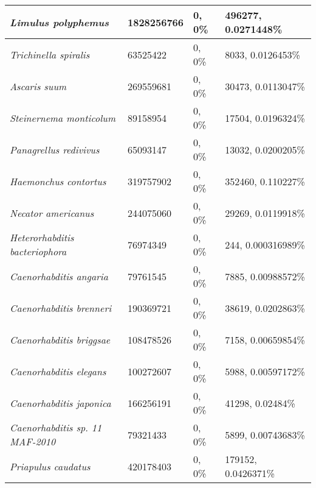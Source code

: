 {\begin{longtable}{| L{4cm} | L{2.7cm}  | L{3.7cm} | L{3.7cm} |}
\textit{Limulus polyphemus} & 1828256766 & 0, 0\% & 496277, 0.0271448\% \\ \hline
\textit{Trichinella spiralis} & 63525422 & 0, 0\% & 8033, 0.0126453\% \\ \hline
\textit{Ascaris suum} & 269559681 & 0, 0\% & 30473, 0.0113047\% \\ \hline
\textit{Steinernema monticolum} & 89158954 & 0, 0\% & 17504, 0.0196324\% \\ \hline
\textit{Panagrellus redivivus} & 65093147 & 0, 0\% & 13032, 0.0200205\% \\ \hline
\textit{Haemonchus contortus} & 319757902 & 0, 0\% & 352460, 0.110227\% \\ \hline
\textit{Necator americanus} & 244075060 & 0, 0\% & 29269, 0.0119918\% \\ \hline
\textit{Heterorhabditis bacteriophora} & 76974349 & 0, 0\% & 244, 0.000316989\% \\ \hline
\textit{Caenorhabditis angaria} & 79761545 & 0, 0\% & 7885, 0.00988572\% \\ \hline
\textit{Caenorhabditis brenneri} & 190369721 & 0, 0\% & 38619, 0.0202863\% \\ \hline
\textit{Caenorhabditis briggsae} & 108478526 & 0, 0\% & 7158, 0.00659854\% \\ \hline
\textit{Caenorhabditis elegans} & 100272607 & 0, 0\% & 5988, 0.00597172\% \\ \hline
\textit{Caenorhabditis japonica} & 166256191 & 0, 0\% & 41298, 0.02484\% \\ \hline
\textit{Caenorhabditis sp. 11 MAF-2010} & 79321433 & 0, 0\% & 5899, 0.00743683\% \\ \hline
\textit{Priapulus caudatus} & 420178403 & 0, 0\% & 179152, 0.0426371\% \\ \hline


\end{longtable}}
